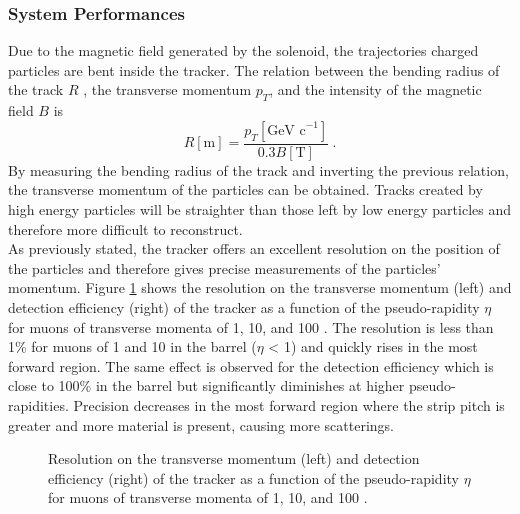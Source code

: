 			\subsubsection{System Performances}
			\label{sec:lhc_and_cms__tracker_system_performances}

				Due to the magnetic field generated by the solenoid, the trajectories charged particles are bent inside the tracker. The relation between the bending radius of the track $ R $ , the transverse momentum $ p_T $, and the intensity of the magnetic field $ B $ is
				\begin{equation}
					R[\mbox{m}] = \frac{p_T[\mbox{GeV c}^{-1}]}{0.3 B[\mbox{T}]} \ .
					\label{eq:lhc_and_cms__radius_to_momentum_relation}
				\end{equation}
				By measuring the bending radius of the track and inverting the previous relation, the transverse momentum of the particles can be obtained. Tracks created by high energy particles will be straighter than those left by low energy particles and therefore more difficult to reconstruct. \\

				As previously stated, the tracker offers an excellent resolution on the position of the particles and therefore gives precise measurements of the particles' momentum. Figure \ref{fig:lhc_and_cms__cms_tracker_performances} shows the resolution on the transverse momentum \pT{} (left) and detection efficiency (right) of the tracker as a function of the pseudo-rapidity $ \eta $ for muons of transverse momenta \pT{} of 1, 10, and 100 \GeVc{}. The resolution is less than 1\% for muons of 1 and 10 \GeVc{} in the barrel ($ \eta $ < 1) and quickly rises in the most forward region. The same effect is observed for the detection efficiency which is close to 100\% in the barrel but significantly diminishes at higher pseudo-rapidities. Precision decreases in the most forward region where the strip pitch is greater and more material is present, causing more scatterings.

				\begin{figure}[h!]
					\centering
					\caption{Resolution on the transverse momentum \pT{} (left) and detection efficiency (right) of the tracker as a function of the pseudo-rapidity $ \eta $ for muons of transverse momenta \pT{} of 1, 10, and 100 \GeVc{} \Cite{CMS_at_LHC}.}
					\label{fig:lhc_and_cms__cms_tracker_performances}
				\end{figure}

